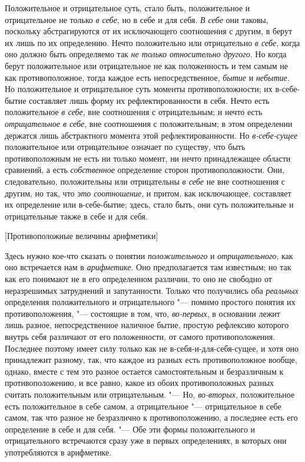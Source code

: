 Положительное и отрицательное суть, стало быть, положительное и
отрицательное не только {\em в себе}, но в себе и для
себя. {\em В себе} они таковы, поскольку абстрагируются
от их исключающего соотношения с другим, в берут их лишь по их определению.
Нечто положительно или отрицательно {\em в себе}, когда
оно должно быть определяемо так {\em не только
относительно другого}. Но когда берут положительное или отрицательное не
как положенность и тем самым не как противоположное, тогда каждое есть
непосредственное, {\em бытие} и
{\em небытие}. Но положительное и отрицательное суть
моменты противоположности; их в-себе-бытие составляет лишь форму их
рефлектированности в себя. Нечто есть положительное
{\em в себе}, вне соотношения с отрицательным; и нечто
есть {\em отрицательное в себе}, вне соотношения с
положительным;
в этом определении держатся лишь абстрактного момента этой
рефлектированности. Но {\em в-себе-сущее} положительное
или отрицательное означает по существу, что быть противоположным не есть ни
только момент, ни нечто принадлежащее области сравнений, а есть
{\em собственное} определение сторон противоположности.
Они, следовательно, положительны или отрицательны
{\em в себе} не вне соотношения с другим, но так, что
{\em это соотношение}, и притом, как исключающее,
составляет их определение или в-себе-бытие; здесь, стало быть, они суть
положительные и отрицательные также в себе и для себя.

%
  {[Противоположные величины арифметики]}

Здесь нужно кое-что сказать о понятии {\em положительного} и
{\em отрицательного}, как оно встречается нам в
{\em арифметике}. Оно предполагается там известным; но
так как его понимают не в его определенном различии, то оно не свободно от
неразрешимых затруднений и запутанности. Только что получились оба
{\em реальных} определения положительного и
отрицательного "--- помимо простого понятия их противоположения,
"--- состоящие в том, что, {\em во-первых}, в основании лежит лишь
разное, непосредственное наличное бытие, простую рефлексию которого внутрь
себя различают от его положенности, от самого противоположения. Последнее
поэтому имеет силу только как не в-себя-и-для-себя-сущее, и хотя оно
принадлежит разному, так, что каждое из разных есть противоположное вообще,
однако, вместе с тем это разное остается самостоятельным и безразличным к
противоположению, и все равно, какое из обоих противоположных разных
считать положительным или отрицательным. "--- Но,
{\em во-вторых}, положительное есть положительное в
себе самом, а отрицательное "--- отрицательное в себе самом, так что разное не
безразлично к противоположению, а последнее есть его определение в себе и
для себя. "--- Обе эти формы положительного и отрицательного встречаются сразу
уже в первых определениях, в которых они употребляются в арифметике.

